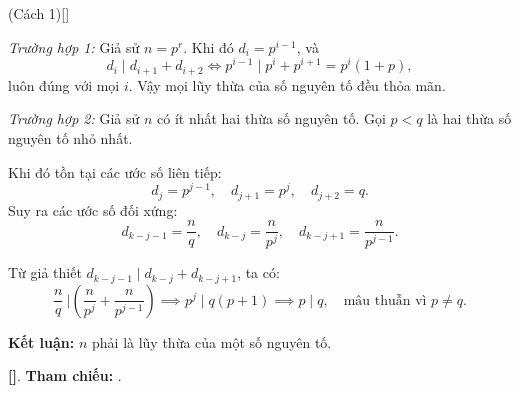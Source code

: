 \documentclass[../2023-n-s.tex]{subfiles}
\begin{document}
\begin{soln}(Cách 1)[\footnotemark]

    \textit{Trường hợp 1:} Giả sử \( n = p^r \). Khi đó \( d_i = p^{i-1} \), và
    \[
        d_i \mid d_{i+1} + d_{i+2} 
        \Leftrightarrow p^{i-1} \mid p^i + p^{i+1} = p^i(1 + p),
    \]
    luôn đúng với mọi \( i \). Vậy mọi lũy thừa của số nguyên tố đều thỏa mãn.

    \medskip

    \textit{Trường hợp 2:} Giả sử \( n \) có ít nhất hai thừa số nguyên tố. Gọi \( p < q \) là hai thừa số nguyên tố nhỏ nhất.

    Khi đó tồn tại các ước số liên tiếp:
    \[
        d_j = p^{j-1},\quad d_{j+1} = p^j,\quad d_{j+2} = q.
    \]
    Suy ra các ước số đối xứng:
    \[
        d_{k-j-1} = \frac{n}{q},\quad d_{k-j} = \frac{n}{p^j},\quad d_{k-j+1} = \frac{n}{p^{j-1}}.
    \]

    Từ giả thiết \( d_{k-j-1} \mid d_{k-j} + d_{k-j+1} \), ta có:
    \[
        \frac{n}{q}\ \bigg| \left( \frac{n}{p^j} + \frac{n}{p^{j-1}} \right) 
        \implies p^j \mid q(p + 1) 
        \implies p \mid q,\quad \text{mâu thuẫn vì } p \ne q.
    \]

    \textbf{Kết luận:} \( n \) phải là lũy thừa của một số nguyên tố.

    \vspace{1em}
    \textbf{[]}.
    \textbf{Tham chiếu:} .
\end{soln}


\newpage
\end{document}
